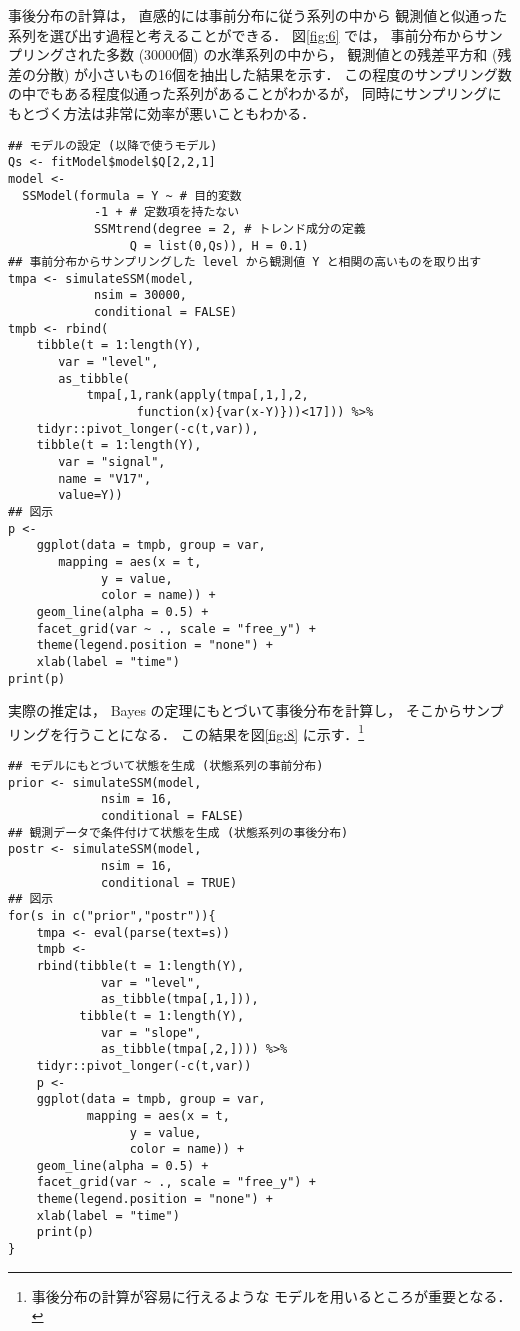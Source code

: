 \documentclass[10pt,oneside,fleqn]{scrartcl}
\begin{document}
事後分布の計算は，
直感的には事前分布に従う系列の中から
観測値と似通った系列を選び出す過程と考えることができる．
図\ref{fig:6}
では，
事前分布からサンプリングされた多数 (30000個)
の水準系列の中から，
観測値との残差平方和 (残差の分散) が小さいもの16個を抽出した結果を示す．
この程度のサンプリング数の中でもある程度似通った系列があることがわかるが，
同時にサンプリングにもとづく方法は非常に効率が悪いこともわかる．

\begin{figure}[htbp]
  \centering
  \myGraph*{}
\end{figure}

\begin{verbatim}
## モデルの設定 (以降で使うモデル)
Qs <- fitModel$model$Q[2,2,1]
model <-
  SSModel(formula = Y ~ # 目的変数
		    -1 + # 定数項を持たない
		    SSMtrend(degree = 2, # トレンド成分の定義
			     Q = list(0,Qs)), H = 0.1)
## 事前分布からサンプリングした level から観測値 Y と相関の高いものを取り出す
tmpa <- simulateSSM(model,
		    nsim = 30000,
		    conditional = FALSE)
tmpb <- rbind(
    tibble(t = 1:length(Y),
	   var = "level",
	   as_tibble(
	       tmpa[,1,rank(apply(tmpa[,1,],2,
				  function(x){var(x-Y)}))<17])) %>%
    tidyr::pivot_longer(-c(t,var)),
    tibble(t = 1:length(Y),
	   var = "signal",
	   name = "V17",
	   value=Y))
## 図示
p <- 
    ggplot(data = tmpb, group = var,
	   mapping = aes(x = t,
			 y = value,
			 color = name)) +
    geom_line(alpha = 0.5) +
    facet_grid(var ~ ., scale = "free_y") +
    theme(legend.position = "none") +
    xlab(label = "time")
print(p)
\end{verbatim}

実際の推定は，
Bayes の定理にもとづいて事後分布を計算し，
そこからサンプリングを行うことになる．
この結果を図\ref{fig:8}
に示す．\footnote{事後分布の計算が容易に行えるような
モデルを用いるところが重要となる．}

\begin{figure*}[htbp]
  \centering
\end{figure*}

\begin{verbatim}
## モデルにもとづいて状態を生成 (状態系列の事前分布)
prior <- simulateSSM(model,
		     nsim = 16,
		     conditional = FALSE)
## 観測データで条件付けて状態を生成 (状態系列の事後分布)
postr <- simulateSSM(model,
		     nsim = 16,
		     conditional = TRUE)
## 図示
for(s in c("prior","postr")){
    tmpa <- eval(parse(text=s))
    tmpb <- 
	rbind(tibble(t = 1:length(Y),
		     var = "level",
		     as_tibble(tmpa[,1,])),
	      tibble(t = 1:length(Y),
		     var = "slope",
		     as_tibble(tmpa[,2,]))) %>%
	tidyr::pivot_longer(-c(t,var)) 
    p <- 
	ggplot(data = tmpb, group = var,
	       mapping = aes(x = t,
			     y = value,
			     color = name)) +
	geom_line(alpha = 0.5) +
	facet_grid(var ~ ., scale = "free_y") +
	theme(legend.position = "none") +
	xlab(label = "time")
    print(p)
}
\end{verbatim}
\end{document}

